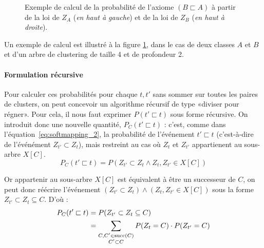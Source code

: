 \begin{figure}[h]
    \centering
    
    \caption[Principe de la méthode Soft Mapping]{Exemple de calcul de la probabilité de l'axiome $(B \sqsubset A)$ à partir de la loi de $Z_A$ (\textit{en haut à gauche}) et de la loi de $Z_B$ (\textit{en haut à droite}).}
    \label{fig:te-softmapping-example}
\end{figure}

Un exemple de calcul est illustré à la figure \ref{fig:te-softmapping-example}, dans le cas de deux classes $A$ et $B$ et d'un arbre de clustering de taille 4 et de profondeur 2.

\paragraph{Formulation récursive}

Pour calculer ces probabilités pour chaque $t, t'$ sans sommer sur toutes les paires de clusters, on peut concevoir un algorithme récursif de type «diviser pour régner». Pour cela, il nous faut exprimer $P(t' \sqsubset t)$ sous forme récursive. On introduit donc une nouvelle quantité,  $P_C(t' \sqsubset t)$ : c'est, comme dans l'équation~\ref{eq:softmapping_2}, la probabilité de l'événement $t' \sqsubset t$ (c'est-à-dire de l'événément $Z_{t'} \subset Z_{t}$), mais restreint au cas où $Z_t$ et $Z_{t'}$ appartienent au sous-arbre $X[C]$.
\begin{equation}
    P_C(t' \sqsubset t) = P(Z_{t'} \subset Z_{t} \land Z_t, Z_{t'} \in X[C])
\end{equation}

Or appartenir au sous-arbre $X[C]$ est équivalent à être un successeur de $C$, on peut donc réécrire l'événement $(Z_{t'} \subset Z_{t}) \land (Z_t, Z_{t'} \in X[C])$ sous la forme $Z_{t'} \subset Z_{t} \subseteq C$. D'où :
\begin{align}
    P_C(t' \sqsubset t) &= P(Z_{t'} \subset Z_{t} \subseteq C) \nonumber \\
    &= \sum_{\substack{C, C' \in \operatorname{succ}(C) \\  C' \subset C}} P(Z_t = C)\cdot P(Z_{t'} = C) \label{eq:proba_subsumption}
\end{align}


